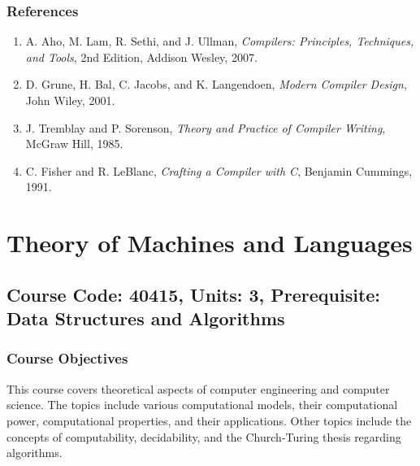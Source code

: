 \documentclass[12pt]{article}
\begin{document}
\subsubsection*{References}
\begin{enumerate}
    \item A. Aho, M. Lam, R. Sethi, and J. Ullman, \textit{Compilers: Principles, Techniques, and Tools}, 2nd Edition, Addison Wesley, 2007.
    \item D. Grune, H. Bal, C. Jacobs, and K. Langendoen, \textit{Modern Compiler Design}, John Wiley, 2001.
    \item J. Tremblay and P. Sorenson, \textit{Theory and Practice of Compiler Writing}, McGraw Hill, 1985.
    \item C. Fisher and R. LeBlanc, \textit{Crafting a Compiler with C}, Benjamin Cummings, 1991.
\end{enumerate}

\newpage

\section{Theory of Machines and Languages}
\subsection*{Course Code: 40415, Units: 3, Prerequisite: Data Structures and Algorithms}

\subsubsection*{Course Objectives}
This course covers theoretical aspects of computer engineering and computer science. The topics include various computational models, their computational power, computational properties, and their applications. Other topics include the concepts of computability, decidability, and the Church-Turing thesis regarding algorithms.
\end{document}
